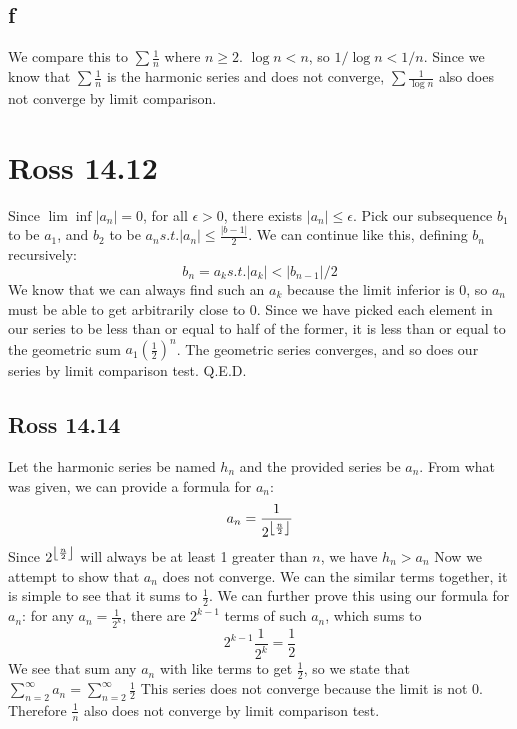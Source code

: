 \documentclass[12pt]{article}
\DeclarePairedDelimiter\floor{\lfloor}{\rfloor}
\begin{document}
\subsection{f}
We compare this to $\sum \frac{1}{n}$ where $n \geq 2$. $\log n < n$, so $1/\log n < 1/ n$. Since we know that $\sum \frac{1}{n}$ is the harmonic series and does not converge, $\sum \frac{1}{\log n}$ also does not converge by limit comparison.
\newpage


\section{Ross 14.12}
Since $\lim \inf |a_n|=0$, for all $\epsilon > 0$, there exists $|a_n|\leq \epsilon$.
\newline
Pick our subsequence $b_1$ to be $a_1$, and $b_2$ to be $a_n s.t. |a_n|\leq\frac{|b-1|}{2}$. We can continue like this, defining $b_n$ recursively:
$$b_n = a_k s.t. |a_k|<|b_{n-1}|/2$$
We know that we can always find such an $a_k$ because the limit inferior is 0, so $a_n$ must be able to get arbitrarily close to 0.
\newline
Since we have picked each element in our series to be less than or equal to half of the former, it is less than or equal to the geometric sum $a_1(\frac{1}{2})^n$. The geometric series converges, and so does our series by limit comparison test.
Q.E.D.


\subsection{Ross 14.14}
Let the harmonic series be named $h_n$ and the provided series be $a_n$.
\newline
From what was given, we can provide a formula for $a_n$: $$a_n = \frac{1}{2^{\floor*{\frac{n}{2}}}}$$
\newline
Since $2^{\floor*{\frac{n}{2}}}$ will always be at least 1 greater than $n$, we have $h_n > a_n$
\newline
Now we attempt to show that $a_n$ does not converge. We can the similar terms together, it is simple to see that it sums to $\frac{1}{2}$. We can further prove this using our formula for $a_n$: for any $a_n = \frac{1}{2^k}$, there are $2^{k-1}$ terms of such $a_n$, which sums to
$$2^{k-1}\frac{1}{2^k} = \frac{1}{2}$$
We see that sum any $a_n$ with like terms to get $\frac{1}{2}$, so we state that $\sum_{n=2}^\infty a_n = \sum_{n=2}^\infty \frac{1}{2}$
\newline
This series does not converge because the limit is not 0. Therefore $\frac{1}{n}$ also does not converge by limit comparison test.
\newpage
\end{document}
